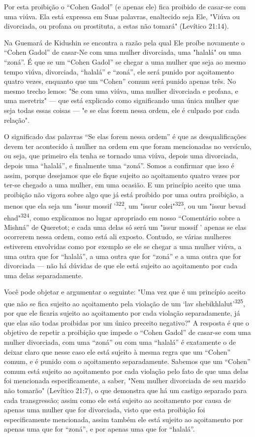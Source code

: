 Por esta proibição o ``Cohen Gadol'' (e apenas ele) fica proibido de
ca­sar-se com uma viúva. Ela está expressa em Suas palavras, enaltecido
seja Ele, "Viúva ou divorciada, ou profana ou prostituta, a estas não
tomará" (Levítico 21:14).

Na Guemará de Kidushin se encontra a razão pela qual Ele proíbe
novamente o ``Cohen Gadol'' de casar-Ne com uma mulher divorciada, uma
"ha­lalá" ou uma ``zoná''. É que se um ``Cohen Gadol'' se chegar a uma
mulher que seja ao mesmo tempo viúva, divorciada, ``halalá'' e ``zoná'', ele
será puni­do por açoitamento quatro vezes, enquanto que um ``Cohen'' comum
será pu­nido apenas três. No mesmo trecho lemos: "Se com uma viúva, uma
mulher divorciada e profana, e uma meretriz" --- que está explicado como
significan­do uma única mulher que seja todas essas coisas --- "e se
elas forem nessa or­dem, ele é culpado por cada relação".

O significado das palavras ``Se elas forem nessa ordem'' é que as
des­qualificações devem ter acontecido à mulher na ordem em que foram
mencio­nadas no versículo, ou seja, que primeiro ela tenha se tornado
uma viúva, de­pois uma divorciada, depois uma ``halalá'', e finalmente uma
``zoná''. Somos a confirmar que isso é assim, porque desejamos que ele
fique sujeito ao açoita­mento quatro vezes por ter-se chegado a uma
mulher, em uma ocasião. E um princípio aceito que uma proibição não
vigora sobre algo que já está proibido por uma outra proibição, a menos
que ela seja um "issur mossif '\textsuperscript{322}, um "is­sur
colei"\textsuperscript{323}, ou um "issur bevad
ehad"\textsuperscript{324}, como explicamos no lugar apro­priado em
nosso ``Comentário sobre a Mishná'' de Queretot; e cada uma delas só será
um "issur mossif ' apenas se elas ocorrerem nessa ordem, como está ali
exposto. Contudo, se várias mulheres estiverem envolvidas como por
exemplo se ele se chegar a uma mulher viúva, a uma outra que for
``halalá'', a uma outra que for ``zoná'' e a uma outra que for divorciada
--- não há dúvidas de que ele está sujeito ao açoitamento por cada uma
delas separadamente.

Você pode objetar e argumentar o seguinte: "Uma vez que é um prin­cípio
aceito que não se fica sujeito ao açoitamento pela violação de um `lav
she­bikhlalut'\textsuperscript{325}, por que ele ficaria sujeito ao
açoitamento por cada violação sepa­radamente, já que elas são todas
proibidas por um único preceito negativo?" A resposta é que o objetivo
de repetir a proibição que impede o ``Cohen Gadol'' de casar-se com uma
mulher divorciada, com uma ``zoná'' ou com uma ``halalá'' é exatamente o de
deixar claro que nesse caso ele está sujeito à mesma regra que um
``Cohen'' comum, e é punido com o açoitamento separadamente. Sabe­mos que
um ``Cohen'' comum está sujeito ao açoitamento por cada violação pe­lo
fato de que uma delas foi mencionada especificamente, a saber, "Nem
mulher divorciada de seu marido não tomarão" (Levítico 21:7), o que
demonstra que há um castigo separado para cada transgressão; assim como
ele está sujeito ao acoitamento por causa de apenas uma mulher que for
divorciada, visto que esta proibição foi especificamente mencionada,
assim também ele está sujeito ao açoi­tamento por apenas uma que for
``zoná'', e por apenas uma que for ``halalá''.

